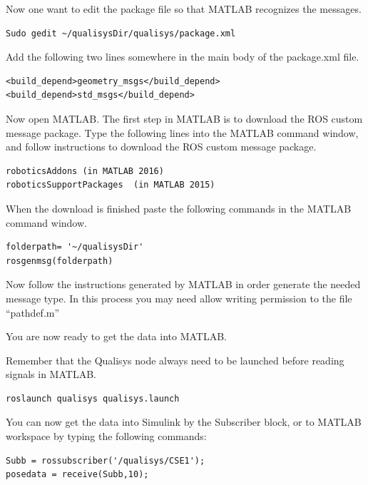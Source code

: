 \documentclass[a4paper,english]{report}
\begin{document}
Now one want to edit the package file so that MATLAB recognizes the messages.

\begin{verbatim}Sudo gedit ~/qualisysDir/qualisys/package.xml\end{verbatim}

Add the following two lines somewhere in the main body of the package.xml file.

\begin{verbatim}<build_depend>geometry_msgs</build_depend>
<build_depend>std_msgs</build_depend>\end{verbatim}

Now open MATLAB. The first step in MATLAB is to download the ROS custom message package. Type the following lines into the MATLAB command window, and follow instructions to download the ROS custom message package.

\begin{verbatim}roboticsAddons (in MATLAB 2016)
roboticsSupportPackages  (in MATLAB 2015)\end{verbatim}

When the download is finished paste the following commands in the MATLAB command window.

\begin{verbatim}folderpath= '~/qualisysDir'
rosgenmsg(folderpath)\end{verbatim}

Now follow the instructions generated by MATLAB in order generate the needed message type. In this process you may need allow writing permission to the file ``pathdef.m''

You are now ready to get the data into MATLAB.

Remember that the Qualisys node always need to be launched before reading signals in MATLAB.

\begin{verbatim}roslaunch qualisys qualisys.launch\end{verbatim}

You can now get the data into Simulink by the Subscriber block, or to MATLAB workspace by typing the following commands:

\begin{verbatim}Subb = rossubscriber('/qualisys/CSE1');
posedata = receive(Subb,10);\end{verbatim}

\clearpage
\end{document}
